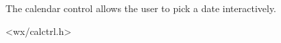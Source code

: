 
\section{}\label{wxcalendarctrl}

The calendar control allows the user to pick a date interactively.


<wx/calctrl.h>



